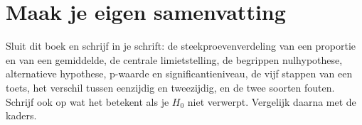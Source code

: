 

\begin{oefeningen}

\end{oefeningen}


\begin{oefeningen}






\end{oefeningen}


\ifzelfstudie
\section*{Maak je eigen samenvatting}
Sluit dit boek en schrijf in je schrift: de steekproevenverdeling van een proportie en van een gemiddelde, de centrale limietstelling, de begrippen nulhypothese, alternatieve hypothese, p-waarde en significantieniveau, de vijf stappen van een toets, het verschil tussen eenzijdig en tweezijdig, en de twee soorten fouten. Schrijf ook op wat het betekent als je $H_0$ niet verwerpt. Vergelijk daarna met de kaders.
\fi
